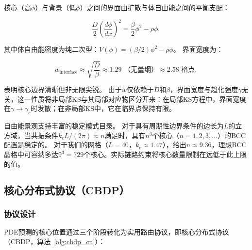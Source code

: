 \documentclass[sn-nature,pdflatex]{sn-jnl}
\begin{document}
核心（高$\phi$）与背景（低$\phi$）之间的界面由扩散与体自由能之间的平衡支配：

\begin{equation}
\frac{D}{2}\left(\frac{d\phi}{dx}\right)^2 = \frac{\beta}{2}\phi^2 - \rho\phi,
\end{equation}

其中体自由能密度为纯二次型：$V(\phi) = (\beta/2)\phi^2 - \rho\phi$。
界面宽度为：

\begin{equation}
w_{\text{interface}} \approx \sqrt{\frac{D}{\beta}} \approx 1.29 \text{ （无量纲）} \approx 2.58 \text{ 格点},
\end{equation}

表明核心边界清晰但非无限尖锐。
由于$w$仅依赖于$D$和$\beta$，界面宽度与趋化强度$\gamma$无关，这一性质将非局部KS与其局部对应物区分开来：在局部KS方程中，界面宽度在$\gamma \to \gamma_c$时发散；在非局部KS中，它在临界点保持有限。

自由能景观支持丰富的稳定模式目录。
对于具有周期性边界条件的边长为$L$的立方域，当共振条件$k_c L/(2\pi) \approx n$满足时，具有$n^3$个核心（$n = 1, 2, 3, \ldots$）的BCC配置是稳定的。
对于我们的网格（$L = 40$，$k_c \approx 1.47$），给出$n \approx 9.36$，理想BCC晶格中可容纳多达$9^3 = 729$个核心。实际链路约束将核心数量限制在远低于此上限的值。

\subsection{核心分布式协议（CBDP）}
\label{sec:algorithm}

\subsubsection{协议设计}

PDE预测的核心位置通过三个阶段转化为实用路由协议，即核心分布式协议（CBDP，算法~\ref{alg:cbdp_cn}）：
\end{document}
